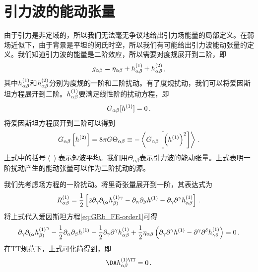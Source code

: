 \section{引力波的能动张量}
由于引力是非定域的，所以我们无法毫无争议地给出引力场能量的局部定义。在弱场近似下，由于背景是平坦的闵氏时空，所以我们有可能给出引力波能动张量的定义。我们知道引力波的能量是二阶效应，所以需要对度规展开到二阶，即
\begin{equation}
    \label{eq:GRb_gExp}
    g_{\alpha \beta} = \eta_{\alpha \beta} + h^{\tiny (1)}_{\alpha \beta} + h^{\tiny (2)}_{\alpha \beta}\,,
\end{equation}
其中$h^{\tiny (1)}_{\alpha \beta}$和$h^{\tiny (2)}_{\alpha \beta}$分别为度规的一阶和二阶扰动。有了度规扰动，我们可以将爱因斯坦方程展开到二阶。$h^{\tiny (1)}_{\alpha \beta}$要满足线性阶的扰动方程，即
\begin{equation}
    \label{eq:GRb_FE-order1}
    G_{\alpha \beta}[h^{\tiny (1)}] = 0\,.
\end{equation}
将爱因斯坦方程展开到二阶可以得到
\begin{equation}
    \label{eq:GRb_FE-order2}
    G_{\alpha \beta}\left[h^{\tiny (2)}\right] = 8 \pi G \Theta_{\alpha \beta} \equiv - \left<G_{\alpha \beta}\left[\left(h^{\tiny (1)}\right)^{2}\right]\right> \,.
\end{equation}
上式中的括号$\left< \right>$表示短波平均\cite{Isaacson:1967zz,Isaacson:1968zza}。我们用$\Theta_{\alpha \beta}$表示引力波的能动张量。上式表明一阶扰动产生的能动张量可以作为二阶扰动的源。

我们先考虑场方程的一阶扰动。将里奇张量展开到一阶，其表达式为
\begin{equation}
    \label{eq:GRb_Ricci1o}
    R^{\tiny (1)}_{\alpha \beta}=\frac{1}{2}\left[2\partial_\gamma \partial_{(\alpha}{h_{\beta)}^{(1)\gamma}} - \partial_\alpha \partial_\beta h^{(1)} - \partial_\gamma \partial^\gamma h^{(1)}_{\alpha \beta}\right]\,.
\end{equation}
将上式代入爱因斯坦方程\eqref{eq:GRb_FE-order1}可得
\begin{multline}
    \label{eq:GRb_FE_Exp1o}
    \partial_\gamma \partial_{(\alpha}{h^{\tiny (1)}_{\beta)}}^\gamma - \frac{1}{2}\partial_\alpha \partial_\beta h^{\tiny (1)} - \frac{1}{2}\partial_\gamma \partial^\gamma h^{\tiny (1)}_{\alpha \beta}
    +\frac{1}{2}\eta_{\alpha \beta}\left(\partial_\gamma \partial^\gamma h^{\tiny (1)} - \partial^\gamma \partial^\delta h^{\tiny (1)}_{\gamma \delta}\right)=0 \,.
\end{multline}
在TT规范下，上式可化简得到，即
\begin{equation}
    \label{eq:GRb_TTEoM}
    \DA h^{\tiny (1)\TT}_{\alpha \beta}=0\,.
\end{equation}


